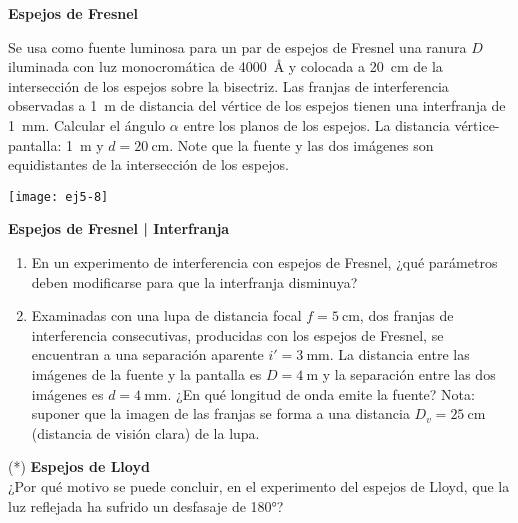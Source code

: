 \item 
\textbf{Espejos de Fresnel}\\
\begin{minipage}[t][3.75cm]{0.6\textwidth}
Se usa como fuente luminosa para un par de espejos de Fresnel una ranura $D$ iluminada con luz monocromática de \SI{4000}{\angstrom} y colocada a \SI{20}{\centi\metre} de la intersección de los espejos sobre la bisectriz.
Las franjas de interferencia observadas a \SI{1}{\metre}  de distancia del vértice de los espejos tienen una interfranja de \SI{1}{\milli\metre}.
Calcular el ángulo $\alpha$ entre los planos de los espejos.
La distancia vértice-pantalla: \SI{1}{\metre} y $d = \SI{20}{\centi\metre}$.
Note que la fuente y las dos imágenes son equidistantes de la intersección de los espejos. 
\end{minipage}
\begin{minipage}[c][1cm][t]{0.35\textwidth}
	\texttt{[image: ej5-8]}
\end{minipage}



\item 
\textbf{Espejos de Fresnel | Interfranja}
\begin{enumerate}
	\item En un experimento de interferencia con espejos de Fresnel, ¿qué parámetros deben modificarse para que la interfranja disminuya?
	\item Examinadas con una lupa de distancia focal $f = \SI{5}{\centi\metre}$, dos franjas de interferencia consecutivas, producidas con los espejos de Fresnel, se encuentran a una separación aparente $i' = \SI{3}{\milli\metre}$.
	La distancia entre las imágenes de la fuente y la pantalla es $D = \SI{4}{\metre}$ y la separación entre las dos imágenes es $d = \SI{4}{\milli\metre}$.
	¿En qué longitud de onda emite la fuente?
	Nota: suponer que la imagen de las franjas se forma a una distancia $D_v = \SI{25}{\centi\metre}$ (distancia de visión clara) de la lupa.
\end{enumerate}



\item (*) \textbf{Espejos de Lloyd}\\
¿Por qué motivo se puede concluir, en el experimento del espejos de Lloyd, que la luz reflejada ha sufrido un desfasaje de \ang{180;;}?

